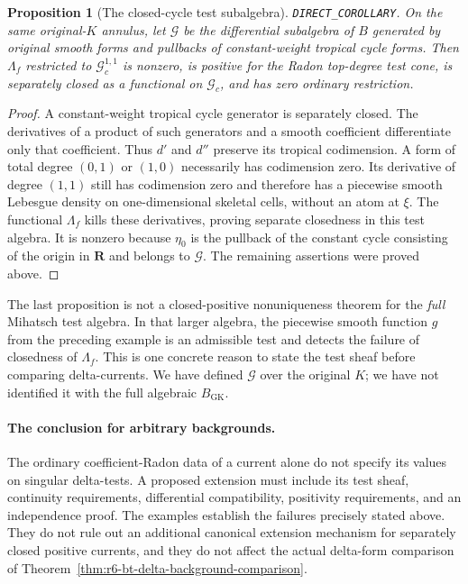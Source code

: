 \documentclass[11pt,a4paper]{article}
\numberwithin{equation}{section}
\newtheorem{proposition}[theorem]{Proposition}
\theoremstyle{definition}
\theoremstyle{remark}
\begin{document}
\begin{proposition}[The closed-cycle test subalgebra]
\label{prop:r6-closed-cycle-subalgebra-ghost}
\textnormal{\texttt{DIRECT\_COROLLARY}.}
On the same original-$K$ annulus, let $\mathscr G$ be the differential
subalgebra of $B$ generated by original smooth forms and pullbacks
of constant-weight tropical cycle forms.  Then $\Lambda_f$ restricted
to $\mathscr G_c^{1,1}$ is nonzero, is positive for the Radon
top-degree test cone, is separately closed as a functional on
$\mathscr G_c$, and has zero ordinary restriction.
\end{proposition}

\begin{proof}
A constant-weight tropical cycle generator is separately closed.
The derivatives of a product of such generators and a smooth
coefficient differentiate only that coefficient.  Thus $d'$ and
$d''$ preserve its tropical codimension.  A form of total degree
$(0,1)$ or $(1,0)$ necessarily has codimension zero.  Its derivative
of degree $(1,1)$ still has codimension zero and therefore has a
piecewise smooth Lebesgue density on one-dimensional skeletal
cells, without an atom at $\xi$.  The functional $\Lambda_f$ kills
these derivatives, proving separate closedness in this test
algebra.  It is nonzero because $\eta_0$ is the pullback of the
constant cycle consisting of the origin in $\mathbf R$ and belongs
to $\mathscr G$.  The remaining assertions were proved above.
\end{proof}

The last proposition is not a closed-positive nonuniqueness theorem
for the \emph{full} Mihatsch test algebra.  In that larger algebra,
the piecewise smooth function $g$ from the preceding example is
an admissible test and detects the failure of closedness of
$\Lambda_f$.  This is one concrete reason to state the test sheaf
before comparing delta-currents.  We have defined $\mathscr G$
over the original $K$; we have not identified it with the full
algebraic $B_{\mathrm{GK}}$.

\paragraph{The conclusion for arbitrary backgrounds.}
The ordinary coefficient-Radon data of a current alone do not
specify its values on singular delta-tests.  A proposed extension
must include its test sheaf, continuity requirements, differential
compatibility, positivity requirements, and an independence proof.
The examples establish the failures precisely stated above.
They do not rule out an additional canonical extension mechanism
for separately closed positive currents, and they do not affect
the actual delta-form comparison of
Theorem~\ref{thm:r6-bt-delta-background-comparison}.
\end{document}

